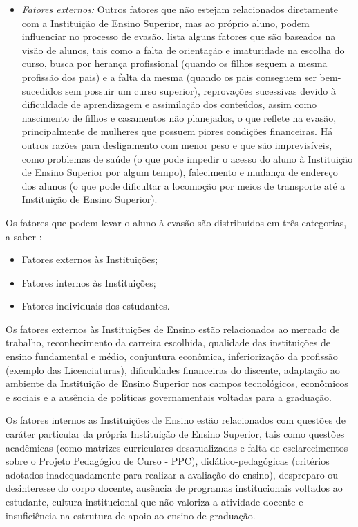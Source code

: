 \begin{itemize}
\item \textit{Fatores externos:} Outros fatores que não estejam relacionados diretamente com a Instituição de Ensino Superior, mas ao próprio aluno, podem influenciar no processo de evasão. \citet{tigrinho2008} lista alguns fatores que são baseados na visão de alunos, tais como a falta de orientação e imaturidade na escolha do curso, busca por herança profissional (quando os filhos seguem a mesma profissão dos pais) e a falta da mesma (quando os pais conseguem ser bem-sucedidos sem possuir um curso superior), reprovações sucessivas devido à dificuldade de aprendizagem e assimilação dos conteúdos, assim como nascimento de filhos e casamentos não planejados, o que reflete na evasão, principalmente de mulheres que possuem piores condições financeiras. Há outros razões para desligamento com menor peso e que são imprevisíveis, como problemas de saúde (o que pode impedir o acesso do aluno à Instituição de Ensino Superior por algum tempo), falecimento e mudança de endereço dos alunos (o que pode dificultar a locomoção por meios de transporte até a Instituição de Ensino Superior).
\end{itemize}

Os fatores que podem levar o aluno à evasão são distribuídos em três categorias, a saber \citep{mec_1997}:

\begin{itemize}
	\item Fatores externos às Instituições;
	\item Fatores internos às Instituições;
	\item Fatores individuais dos estudantes.
\end{itemize}

Os fatores externos às Instituições de Ensino estão relacionados ao mercado de trabalho, reconhecimento da carreira escolhida, qualidade das instituições de ensino fundamental e médio, conjuntura econômica, inferiorização da profissão (exemplo das Licenciaturas), dificuldades financeiras do discente, adaptação ao ambiente da Instituição de Ensino Superior nos campos tecnológicos, econômicos e sociais e a ausência de políticas governamentais voltadas para a graduação. 

Os fatores internos as Instituições de Ensino estão relacionados com questões de caráter particular da própria Instituição de Ensino Superior, tais como questões acadêmicas  (como matrizes curriculares desatualizadas e falta de esclarecimentos sobre o Projeto Pedagógico de Curso - PPC), didático-pedagógicas (critérios adotados inadequadamente para realizar a avaliação do ensino), despreparo ou desinteresse do corpo docente, ausência de programas institucionais voltados ao estudante, cultura institucional que não valoriza a atividade docente e insuficiência na estrutura de apoio ao ensino de graduação.

